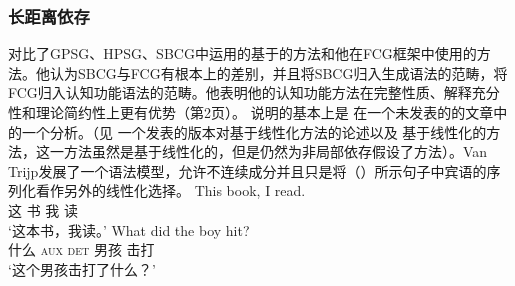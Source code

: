 \subsubsection{长距离依存}
\label{sec-fcg-nld}

 对比了GPSG、HPSG、SBCG中运用的基于\slaschc 的方法和他在FCG框架中使用的方法。他认为SBCG与FCG有根本上的差别，并且将SBCG归入生成语法的范畴，将FCG归入认知功能语法的范畴。他表明他的认知功能方法在完整性质、解释充分性和理论简约性上更有优势（第2页）。 \citet{vanTrijp2014a}说明的基本上是 \citet{Reape2000a}在一个未发表的的文章中的一个分析。（见 一个发表的版本对基于线性化方法的论述以及 基于线性化的方法，这一方法虽然是基于线性化的，但是仍然为非局部依存假设了\slaschc 方法）。Van Trijp发展了一个语法模型，允许不连续成分并且只是将（）所示句子中宾语的序列化看作另外的线性化选择。
\eal
\ex 
\gll This book, I read.\\  
    这 书 我 读\\
\glt `这本书，我读。'
\ex 
\gll What did the boy hit?\\  
    什么 \textsc{aux} \textsc{det} 男孩 击打\\
\glt `这个男孩击打了什么？'
